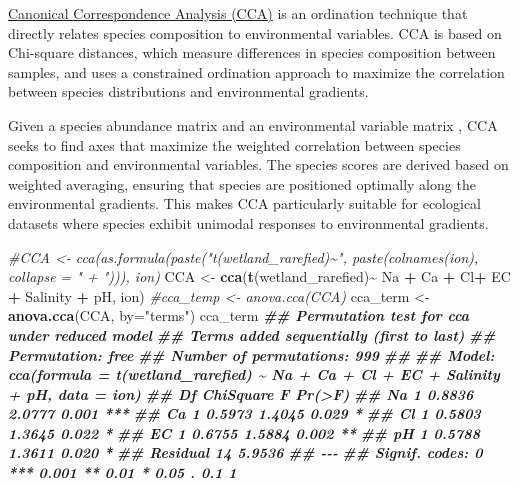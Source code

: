 \documentclass[
]{article}
\newenvironment{Shaded}{\begin{snugshade}}{\end{snugshade}}
\newcommand{\AttributeTok}[1]{\textcolor[rgb]{0.13,0.29,0.53}{#1}}
\newcommand{\CommentTok}[1]{\textcolor[rgb]{0.56,0.35,0.01}{\textit{#1}}}
\newcommand{\DocumentationTok}[1]{\textcolor[rgb]{0.56,0.35,0.01}{\textbf{\textit{#1}}}}
\newcommand{\FunctionTok}[1]{\textcolor[rgb]{0.13,0.29,0.53}{\textbf{#1}}}
\newcommand{\NormalTok}[1]{#1}
\newcommand{\OtherTok}[1]{\textcolor[rgb]{0.56,0.35,0.01}{#1}}
\newcommand{\SpecialCharTok}[1]{\textcolor[rgb]{0.81,0.36,0.00}{\textbf{#1}}}
\newcommand{\StringTok}[1]{\textcolor[rgb]{0.31,0.60,0.02}{#1}}
\begin{document}
\href{https://uw.pressbooks.pub/appliedmultivariatestatistics/chapter/ca-dca-and-cca/}{Canonical
Correspondence Analysis (CCA)} is an ordination technique that directly
relates species composition to environmental variables. CCA is based on
Chi-square distances, which measure differences in species composition
between samples, and uses a constrained ordination approach to maximize
the correlation between species distributions and environmental
gradients.

Given a species abundance matrix and an environmental variable matrix ,
CCA seeks to find axes that maximize the weighted correlation between
species composition and environmental variables. The species scores are
derived based on weighted averaging, ensuring that species are
positioned optimally along the environmental gradients. This makes CCA
particularly suitable for ecological datasets where species exhibit
unimodal responses to environmental gradients.

\begin{Shaded}
\begin{Highlighting}[]
\CommentTok{\#CCA \textless{}{-} cca(as.formula(paste("t(wetland\_rarefied)\textasciitilde{}", paste(colnames(ion), collapse = " + "))), ion)}
\NormalTok{CCA }\OtherTok{\textless{}{-}} \FunctionTok{cca}\NormalTok{(}\FunctionTok{t}\NormalTok{(wetland\_rarefied)}\SpecialCharTok{\textasciitilde{}}\NormalTok{ Na }\SpecialCharTok{+}\NormalTok{ Ca }\SpecialCharTok{+}\NormalTok{ Cl}\SpecialCharTok{+}\NormalTok{ EC }\SpecialCharTok{+}\NormalTok{ Salinity }\SpecialCharTok{+}\NormalTok{ pH, ion)}
\CommentTok{\#cca\_temp \textless{}{-} anova.cca(CCA)}
\NormalTok{cca\_term }\OtherTok{\textless{}{-}} \FunctionTok{anova.cca}\NormalTok{(CCA, }\AttributeTok{by=}\StringTok{"terms"}\NormalTok{)}
\NormalTok{cca\_term        }
\DocumentationTok{\#\# Permutation test for cca under reduced model}
\DocumentationTok{\#\# Terms added sequentially (first to last)}
\DocumentationTok{\#\# Permutation: free}
\DocumentationTok{\#\# Number of permutations: 999}
\DocumentationTok{\#\# }
\DocumentationTok{\#\# Model: cca(formula = t(wetland\_rarefied) \textasciitilde{} Na + Ca + Cl + EC + Salinity + pH, data = ion)}
\DocumentationTok{\#\#          Df ChiSquare      F Pr(\textgreater{}F)    }
\DocumentationTok{\#\# Na        1    0.8836 2.0777  0.001 ***}
\DocumentationTok{\#\# Ca        1    0.5973 1.4045  0.029 *  }
\DocumentationTok{\#\# Cl        1    0.5803 1.3645  0.022 *  }
\DocumentationTok{\#\# EC        1    0.6755 1.5884  0.002 ** }
\DocumentationTok{\#\# pH        1    0.5788 1.3611  0.020 *  }
\DocumentationTok{\#\# Residual 14    5.9536                  }
\DocumentationTok{\#\# {-}{-}{-}}
\DocumentationTok{\#\# Signif. codes:  0 \textquotesingle{}***\textquotesingle{} 0.001 \textquotesingle{}**\textquotesingle{} 0.01 \textquotesingle{}*\textquotesingle{} 0.05 \textquotesingle{}.\textquotesingle{} 0.1 \textquotesingle{} \textquotesingle{} 1}
\end{Highlighting}
\end{Shaded}
\end{document}
